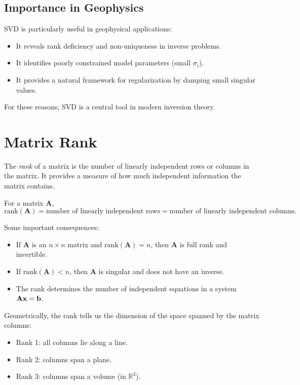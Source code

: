 \subsection*{Importance in Geophysics}

SVD is particularly useful in geophysical applications:
\begin{itemize}
    \item It reveals rank deficiency and non-uniqueness in inverse problems.
    \item It identifies poorly constrained model parameters (small $\sigma_i$).
    \item It provides a natural framework for regularization by damping small
    singular values.
\end{itemize}

For these reasons, SVD is a central tool in modern inversion theory.

\section{Matrix Rank}

The \emph{rank} of a matrix is the number of linearly independent rows or
columns in the matrix. It provides a measure of how much independent
information the matrix contains.

For a matrix $\mathbf{A}$,
\begin{equation}
    \mathrm{rank}(\mathbf{A}) = \text{number of linearly independent rows}
    = \text{number of linearly independent columns}.
\end{equation}

Some important consequences:
\begin{itemize}
    \item If $\mathbf{A}$ is an $n \times n$ matrix and
    $\mathrm{rank}(\mathbf{A}) = n$, then $\mathbf{A}$ is full rank and
    invertible.
    \item If $\mathrm{rank}(\mathbf{A}) < n$, then $\mathbf{A}$ is singular and
    does not have an inverse.
    \item The rank determines the number of independent equations in a system
    $\mathbf{A}\vb{x} = \vb{b}$.
\end{itemize}

Geometrically, the rank tells us the dimension of the space spanned by the
matrix columns:
\begin{itemize}
    \item Rank 1: all columns lie along a line.
    \item Rank 2: columns span a plane.
    \item Rank 3: columns span a volume (in $\mathbb{R}^3$).
\end{itemize}


